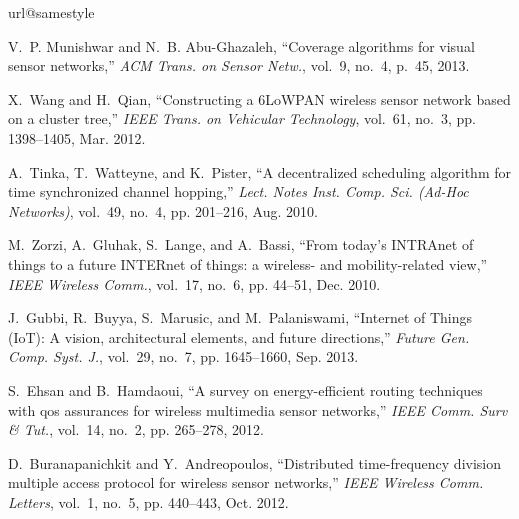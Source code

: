 \documentclass[twocolumn,english]{IEEEtran}
\theoremstyle{plain}
\theoremstyle{definition}
\begin{document}
\begin{thebibliography}{10}
\providecommand{\url}[1]{#1}
\csname url@samestyle\endcsname
\providecommand{\newblock}{\relax}
\providecommand{\bibinfo}[2]{#2}
\providecommand{\BIBentrySTDinterwordspacing}{\spaceskip=0pt\relax}
\providecommand{\BIBentryALTinterwordstretchfactor}{4}
\providecommand{\BIBentryALTinterwordspacing}{\spaceskip=\fontdimen2\font plus
\BIBentryALTinterwordstretchfactor\fontdimen3\font minus
  \fontdimen4\font\relax}
\providecommand{\BIBforeignlanguage}[2]{{\expandafter\ifx\csname l@#1\endcsname\relax
\typeout{** WARNING: IEEEtran.bst: No hyphenation pattern has been}\typeout{** loaded for the language `#1'. Using the pattern for}\typeout{** the default language instead.}\else
\language=\csname l@#1\endcsname
\fi
#2}}
\providecommand{\BIBdecl}{\relax}
\BIBdecl

V.~P. Munishwar and N.~B. Abu-Ghazaleh, ``Coverage algorithms for visual sensor
  networks,'' \emph{ACM Trans. on Sensor Netw.}, vol.~9, no.~4, p.~45, 2013.

X.~Wang and H.~Qian, ``Constructing a {6LoWPAN} wireless sensor network based
  on a cluster tree,'' \emph{IEEE Trans. on Vehicular Technology}, vol.~61,
  no.~3, pp. 1398--1405, Mar. 2012.

A.~Tinka, T.~Watteyne, and K.~Pister, ``A decentralized scheduling algorithm
  for time synchronized channel hopping,'' \emph{Lect. Notes Inst. Comp. Sci.
  (Ad-Hoc Networks)}, vol.~49, no.~4, pp. 201--216, Aug. 2010.

M.~Zorzi, A.~Gluhak, S.~Lange, and A.~Bassi, ``From today's {INTRAnet of things
  to a future INTERnet} of things: a wireless- and mobility-related view,''
  \emph{IEEE Wireless Comm.}, vol.~17, no.~6, pp. 44--51, Dec. 2010.

J.~Gubbi, R.~Buyya, S.~Marusic, and M.~Palaniswami, ``{Internet of Things
  (IoT)}: A vision, architectural elements, and future directions,''
  \emph{Future Gen. Comp. Syst. J.}, vol.~29, no.~7, pp. 1645--1660, Sep. 2013.

S.~Ehsan and B.~Hamdaoui, ``A survey on energy-efficient routing techniques
  with qos assurances for wireless multimedia sensor networks,'' \emph{IEEE
  Comm. Surv \& Tut.}, vol.~14, no.~2, pp. 265--278, 2012.

D.~Buranapanichkit and Y.~Andreopoulos, ``Distributed time-frequency division
  multiple access protocol for wireless sensor networks,'' \emph{IEEE Wireless
  Comm. Letters}, vol.~1, no.~5, pp. 440--443, Oct. 2012.


\end{thebibliography}
\end{document}
